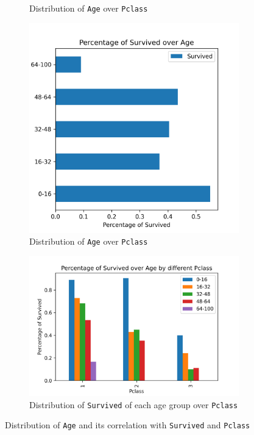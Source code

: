 \documentclass[10pt]{article}
\begin{document}
\begin{figure}[!htbp]
\begin{subfigure}[b]{0.49\textwidth}
        \caption{Distribution of \texttt{Age} over \texttt{Pclass}}
        \label{fig:age_vs_pclass}
    \end{subfigure}
    \begin{subfigure}[b]{0.49\textwidth}
        \centering
        \includegraphics[width=\textwidth]{../hw1/img/Part_II/percentage_of_survived_over_age_group.png}
        \caption{Distribution of \texttt{Age} over \texttt{Pclass}}
        \label{fig:age_groups_vs_survived}
    \end{subfigure}
    \begin{subfigure}[b]{0.49\textwidth}
        \centering
        \includegraphics[width=\textwidth]{../hw1/img/Part_II/percentage_of_survived_over_age_by_pclass.png}
        \caption{Distribution of \texttt{Survived} of each age group over \texttt{Pclass}}
        \label{fig:age_groups_vs_survived_by_pclass}
    \end{subfigure}
    \caption{Distribution of \texttt{Age} and its correlation with \texttt{Survived} and \texttt{Pclass}}
    \label{fig:age}
\end{figure}
\end{document}
